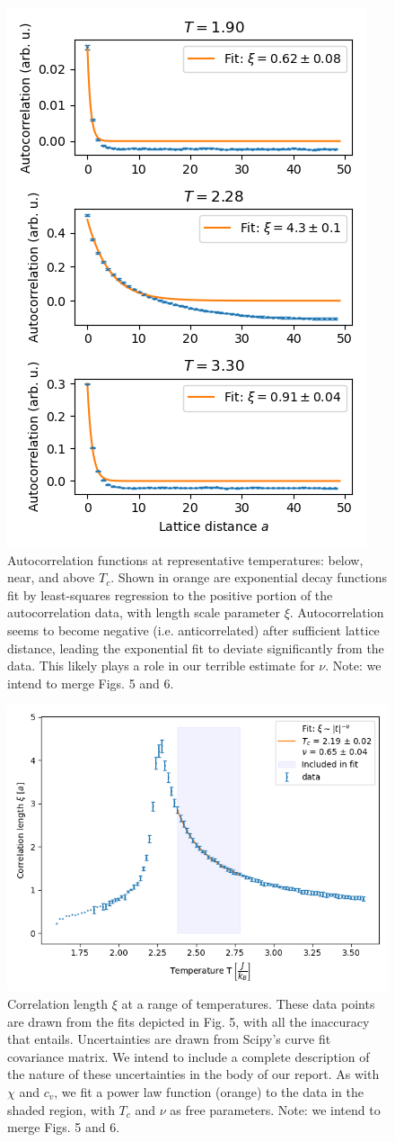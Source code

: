 \documentclass[letter,scriptaddress,twocolumn, prl]{revtex4}
\begin{document}
\begin{figure}[h]
	\begin{center}
		\includegraphics[width=.4\textwidth]{figs/fig4_autocors.png}
		\caption{Autocorrelation functions at representative temperatures: below, near, and above $T_c$. Shown in orange are exponential decay functions fit by least-squares regression to the positive portion of the autocorrelation data, with length scale parameter $\xi$. Autocorrelation seems to become negative (i.e. anticorrelated) after sufficient lattice distance, leading the exponential fit to deviate significantly from the data. This likely plays a role in our terrible estimate for $\nu$. Note: we intend to merge Figs. 5 and 6.}
		\label{fig:fig4a}
	\end{center}
\end{figure}
\begin{figure}[h]
	\begin{center}
		\includegraphics[width=.4\textwidth]{figs/fig4_xi.png}
		\caption{Correlation length $\xi$ at a range of temperatures. These data points are drawn from the fits depicted in Fig. 5, with all the inaccuracy that entails. Uncertainties are drawn from Scipy's curve fit covariance matrix. We intend to include a complete description of the nature of these uncertainties in the body of our report. As with $\chi$ and $c_v$, we fit a power law function (orange) to the data in the shaded region, with $T_c$ and $\nu$ as free parameters. Note: we intend to merge Figs. 5 and 6.}
		\label{fig:fig4b}
	\end{center}
\end{figure}
\end{document}
